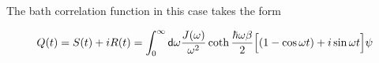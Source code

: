The bath correlation function in this case takes the form

\[ Q(t) = S(t) + i R(t) = \int_{0}^{\infty} \mathsf{d} \omega \frac{J(\omega)}{\omega^2} 
\coth \frac{\hbar \omega \beta}{2} \Bigl[ \left( 1 - \cos \omega t  \right) + i \sin \omega 
t \Bigr] \psi \]